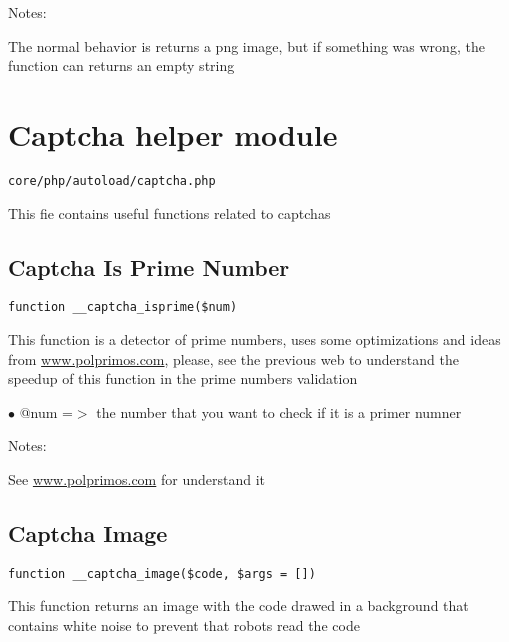 \documentclass[a4paper]{book}
\def\htmladdnormallink#1#2{\href{#2}{#1}}
\begin{document}
Notes:

The normal behavior is returns a png image, but if something was wrong,
the function can returns an empty string

\hypertarget{toc40}{}
\section{Captcha helper module}

\begin{lstlisting}
core/php/autoload/captcha.php
\end{lstlisting}

This fie contains useful functions related to captchas

\hypertarget{toc41}{}
\subsection{Captcha Is Prime Number}

\begin{lstlisting}
function __captcha_isprime($num)
\end{lstlisting}

This function is a detector of prime numbers, uses some optimizations and
ideas from \htmladdnormallink{www.polprimos.com}{www.polprimos.com}, please, see the previous web to understand
the speedup of this function in the prime numbers validation

\begin{compactitem}
\item[\color{myblue}$\bullet$] @num =$>$ the number that you want to check if it is a primer numner
\end{compactitem}

Notes:

See \htmladdnormallink{www.polprimos.com}{www.polprimos.com} for understand it

\hypertarget{toc42}{}
\subsection{Captcha Image}

\begin{lstlisting}
function __captcha_image($code, $args = [])
\end{lstlisting}

This function returns an image with the code drawed in a background that
contains white noise to prevent that robots read the code
\end{document}
